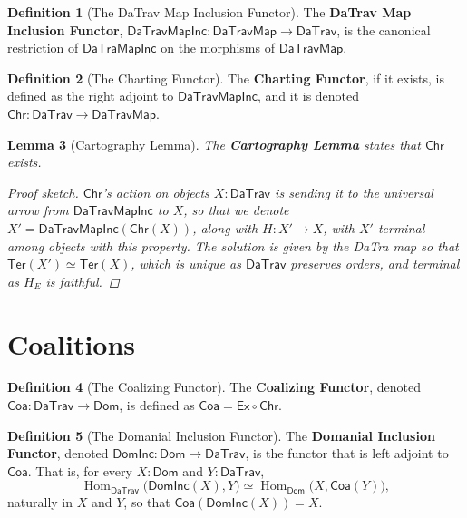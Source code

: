 \documentclass[11pt]{article}
\theoremstyle{definition}
\newtheorem{definition}{Definition}[section]
\theoremstyle{plain}
\newtheorem{lemma}[definition]{Lemma}
\newcommand{\Hom}{\operatorname{Hom}}
\begin{document}
\begin{definition}[The DaTrav Map Inclusion Functor]
The \textbf{DaTrav Map Inclusion Functor},
$\mathsf{DaTravMapInc} : \mathsf{DaTravMap} \to \mathsf{DaTrav}$, is the
canonical restriction of $\mathsf{DaTraMapInc}$ on the morphisms of
$\mathsf{DaTravMap}$.
\end{definition}

\begin{definition}[The Charting Functor]
The \textbf{Charting Functor}, if it exists, is defined as the right adjoint
to $\mathsf{DaTravMapInc}$, and it is denoted
$\mathsf{Chr} : \mathsf{DaTrav} \to \mathsf{DaTravMap}$.
\end{definition}

\begin{lemma}[Cartography Lemma]
The \textbf{Cartography Lemma} states that $\mathsf{Chr}$ exists.

\begin{proof}[Proof sketch]
$\mathsf{Chr}$'s action on objects $X : \mathsf{DaTrav}$ is sending it to the
universal arrow from $\mathsf{DaTravMapInc}$ to $X$, so that we denote
$X' = \mathsf{DaTravMapInc}(\mathsf{Chr}(X))$, along with $H : X' \to X$,
with $X'$ terminal among objects with this property. The solution is given by
the DaTra map so that $\mathsf{Ter}(X') \simeq \mathsf{Ter}(X)$, which is
unique as $\mathsf{DaTrav}$ preserves orders, and terminal as $H_E$ is
faithful.
\end{proof}
\end{lemma}

\section{Coalitions}

\begin{definition}[The Coalizing Functor]
The \textbf{Coalizing Functor}, denoted
$\mathsf{Coa} : \mathsf{DaTrav} \to \mathsf{Dom}$, is defined as
$\mathsf{Coa} = \mathsf{Ex} \circ \mathsf{Chr}$.
\end{definition}

\begin{definition}[The Domanial Inclusion Functor]
The \textbf{Domanial Inclusion Functor}, denoted
$\mathsf{DomInc} : \mathsf{Dom} \to \mathsf{DaTrav}$, is the functor that is
left adjoint to $\mathsf{Coa}$. That is, for every $X : \mathsf{Dom}$ and
$Y : \mathsf{DaTrav}$,
\[
  \Hom_{\mathsf{DaTrav}}\bigl(\mathsf{DomInc}(X),Y\bigr)
  \simeq
  \Hom_{\mathsf{Dom}}\bigl(X,\mathsf{Coa}(Y)\bigr),
\]
naturally in $X$ and $Y$, so that
$\mathsf{Coa}(\mathsf{DomInc}(X))=X$.
\end{definition}
\end{document}
